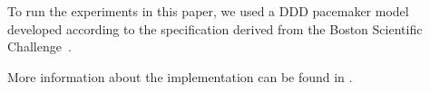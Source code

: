 To run the experiments in this paper, we used a DDD pacemaker model developed according to the specification derived from the Boston Scientific Challenge~\cite{challenge}.

More information about the implementation can be found in \cite{STTT13}. 

%
%
%
%
%
